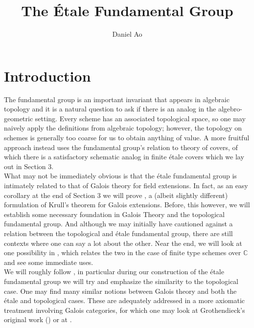 \documentclass{article}
\theoremstyle{definition}
\theoremstyle{remark}
\newcommand{\C}{\mathbb{C}}
\begin{document}
\title{The \'Etale Fundamental Group}
\author{Daniel Ao}

\maketitle

\tableofcontents

\section{Introduction}

The fundamental group is an important invariant that appears in algebraic topology and it is a natural question to ask if there is an analog in the algebro-geometric setting.
Every scheme has an associated topological space, so one may naively apply the definitions from algebraic topology; however, the topology on schemes is generally too coarse for us to obtain anything of value.
A more fruitful approach instead uses the fundamental group's relation to theory of covers, of which there is a satisfactory schematic analog in finite \'etale covers which we lay out in Section 3.\\

What may not be immediately obvious is that the \'etale fundamental group is intimately related to that of Galois theory for field extensions. 
In fact, as an easy corollary at the end of Section 3 we will prove , a (albeit slightly different) formulation of Krull's theorem for Galois extensions.
Before, this however, we will establish some necessary foundation in Galois Theory and the topological fundamental group. 
And although we may initially have cautioned against a relation between the topological and \'etale fundamental group, there are still contexts where one can say a lot about the other.
Near the end, we will look at one possibility in , which relates the two in the case of finite type schemes over $\C$ and see some immediate uses.\\

\indent We will roughly follow \cite{Szamuely}, in particular during our construction of the \'etale fundamental group we will try and emphasize the similarity to the topological case.
One may find many similar notions between Galois theory and both the \'etale and topological cases.
These are adequately addressed in a more axiomatic treatment involving Galois categories, for which one may look at Grothendieck's original work (\cite{grothendieck}) or at \cite{Lenstra}.
\end{document}
